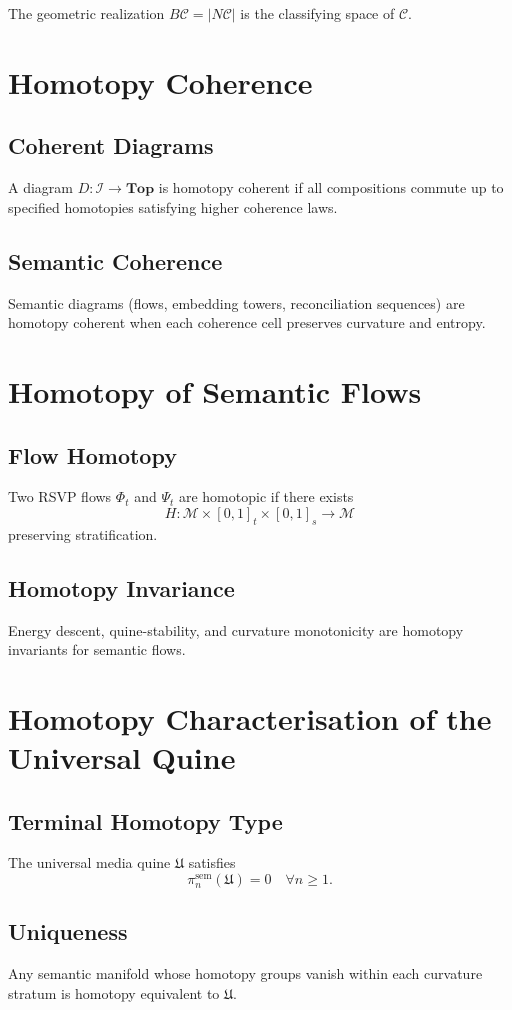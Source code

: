 The geometric realization $B\mathcal{C}=|N\mathcal{C}|$ is the classifying space of $\mathcal{C}$.

\section{Homotopy Coherence}

\subsection{Coherent Diagrams}

A diagram $D:\mathcal{I}\to\mathbf{Top}$ is homotopy coherent if all compositions commute up to specified homotopies satisfying higher coherence laws.

\subsection{Semantic Coherence}

Semantic diagrams (flows, embedding towers, reconciliation sequences) are homotopy coherent when each coherence cell preserves curvature and entropy.

\section{Homotopy of Semantic Flows}

\subsection{Flow Homotopy}

Two RSVP flows $\Phi_t$ and $\Psi_t$ are homotopic if there exists
\[
H: \mathcal{M}\times[0,1]_t \times[0,1]_s \to \mathcal{M}
\]
preserving stratification.

\subsection{Homotopy Invariance}

Energy descent, quine-stability, and curvature monotonicity are homotopy invariants for semantic flows.

\section{Homotopy Characterisation of the Universal Quine}

\subsection{Terminal Homotopy Type}

The universal media quine $\mathfrak{U}$ satisfies
\[
\pi_n^{\mathrm{sem}}(\mathfrak{U}) = 0
\quad \forall n\ge 1.
\]

\subsection{Uniqueness}

Any semantic manifold whose homotopy groups vanish within each curvature stratum is homotopy equivalent to $\mathfrak{U}$.


